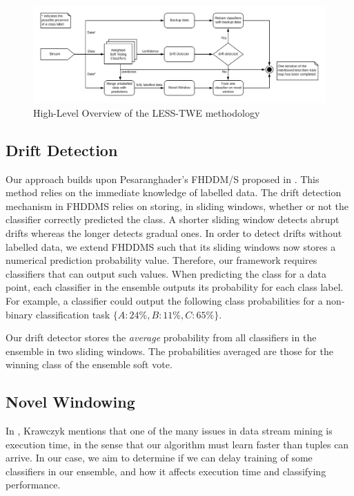 \documentclass[runningheads]{llncs}
\begin{document}
\begin{figure}
  \includegraphics[width=\linewidth]{./images/chapter3/prequential_loop}
\caption{\label{fig:prequential_loop}High-Level Overview of the LESS-TWE methodology}
\end{figure}

\subsection{Drift Detection}
Our approach builds upon Pesaranghader's FHDDM/S proposed in \cite{pesaranghader2016fast}. This method relies on the immediate knowledge of labelled data. The drift detection mechanism in FHDDMS relies on storing, in sliding windows, whether or not the classifier correctly predicted the class. A shorter sliding window detects abrupt drifts whereas the longer detects gradual ones. In order to detect drifts without labelled data, we  extend FHDDMS such that its sliding windows now stores a numerical prediction probability value. Therefore, our framework requires classifiers that can output such values. When predicting the class for a data point, each classifier in the ensemble outputs its probability for each class label. For example, a classifier could output the following class probabilities for a non-binary classification task $\{A: 24\%, B: 11\%, C: 65\%\}$.

Our drift detector stores the \textit{average} probability from all classifiers in the ensemble in two sliding windows. The probabilities averaged are those for the winning class of the ensemble soft vote.

\subsection{Novel Windowing}
In \cite{KRAWCZYK2017132}, Krawczyk mentions that one of the many issues in data stream mining is execution time, in the sense that our algorithm must learn faster than tuples can arrive. In our case, we aim to determine if we can delay training of some classifiers in our ensemble, and how it affects execution time and classifying performance.
\end{document}
